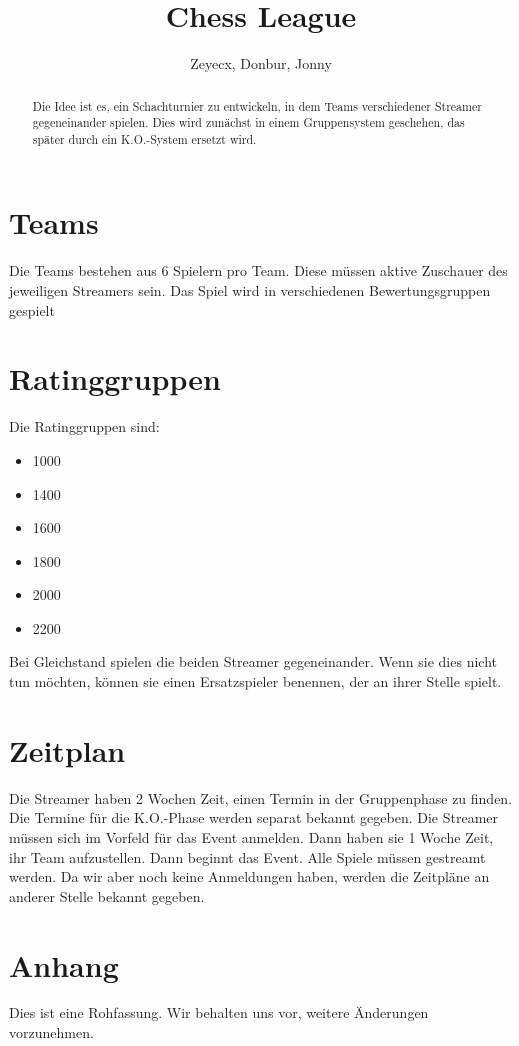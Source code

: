 \documentclass[preprint,12pt]{elsarticle}
\begin{document}
	
\begin{frontmatter}
		
		
\title{Chess League}
		
\author{Zeyecx, Donbur, Jonny}
		
\address{German Paper}
	 
\begin{abstract}
	Die Idee ist es, ein Schachturnier zu entwickeln, in dem Teams verschiedener Streamer gegeneinander spielen.
	Dies wird zunächst in einem Gruppensystem geschehen, das später durch ein K.O.-System ersetzt wird. 
\end{abstract}
\end{frontmatter}
\linenumbers
\section{Teams}
Die Teams bestehen aus 6 Spielern pro Team. Diese müssen aktive Zuschauer des jeweiligen Streamers sein. 
Das Spiel wird in verschiedenen Bewertungsgruppen gespielt

\section{Ratinggruppen}

Die Ratinggruppen sind:
\begin{itemize}
	\item 1000
	\item 1400 
	\item 1600
	\item 1800
	\item 2000
	\item 2200
\end{itemize}
Bei Gleichstand spielen die beiden Streamer gegeneinander. Wenn sie dies nicht tun möchten, können sie einen Ersatzspieler benennen, der an ihrer Stelle spielt.

\section{Zeitplan}
Die Streamer haben 2 Wochen Zeit, einen Termin in der Gruppenphase zu finden. Die Termine für die K.O.-Phase werden separat bekannt gegeben.
Die Streamer müssen sich im Vorfeld für das Event anmelden. Dann haben sie 1 Woche Zeit, ihr Team aufzustellen.
Dann beginnt das Event.
Alle Spiele müssen gestreamt werden.
Da wir aber noch keine Anmeldungen haben, werden die Zeitpläne an anderer Stelle bekannt gegeben.

\section{Anhang}
Dies ist eine Rohfassung. Wir behalten uns vor, weitere Änderungen vorzunehmen.







	
\end{document}
